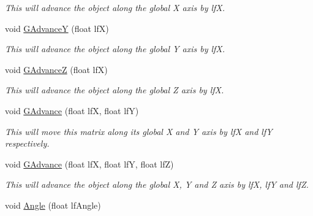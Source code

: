 \begin{DoxyCompactItemize}
\begin{DoxyCompactList}\small\item\em This will advance the object along the global X axis by lfX. \end{DoxyCompactList}\item 
\hypertarget{classc_matrix4_af4453f95ef875b0c5002d72bade65bb1}{
void \hyperlink{classc_matrix4_af4453f95ef875b0c5002d72bade65bb1}{GAdvanceY} (float lfX)}
\label{classc_matrix4_af4453f95ef875b0c5002d72bade65bb1}

\begin{DoxyCompactList}\small\item\em This will advance the object along the global Y axis by lfX. \end{DoxyCompactList}\item 
\hypertarget{classc_matrix4_a0fd4e894762e73050e8e2e38acdfaf0d}{
void \hyperlink{classc_matrix4_a0fd4e894762e73050e8e2e38acdfaf0d}{GAdvanceZ} (float lfX)}
\label{classc_matrix4_a0fd4e894762e73050e8e2e38acdfaf0d}

\begin{DoxyCompactList}\small\item\em This will advance the object along the global Z axis by lfX. \end{DoxyCompactList}\item 
\hypertarget{classc_matrix4_a2dc12cbe708c7bc63ca2beff47c0c835}{
void \hyperlink{classc_matrix4_a2dc12cbe708c7bc63ca2beff47c0c835}{GAdvance} (float lfX, float lfY)}
\label{classc_matrix4_a2dc12cbe708c7bc63ca2beff47c0c835}

\begin{DoxyCompactList}\small\item\em This will move this matrix along its global X and Y axis by lfX and lfY respectively. \end{DoxyCompactList}\item 
\hypertarget{classc_matrix4_ac1c16ceb7ac4c2f771fc0d4662df643c}{
void \hyperlink{classc_matrix4_ac1c16ceb7ac4c2f771fc0d4662df643c}{GAdvance} (float lfX, float lfY, float lfZ)}
\label{classc_matrix4_ac1c16ceb7ac4c2f771fc0d4662df643c}

\begin{DoxyCompactList}\small\item\em This will advance the object along the global X, Y and Z axis by lfX, lfY and lfZ. \end{DoxyCompactList}\item 
\hypertarget{classc_matrix4_ac86eb165802e359a11ace5db20b73c72}{
void \hyperlink{classc_matrix4_ac86eb165802e359a11ace5db20b73c72}{Angle} (float lfAngle)}
\label{classc_matrix4_ac86eb165802e359a11ace5db20b73c72}


\end{DoxyCompactItemize}
